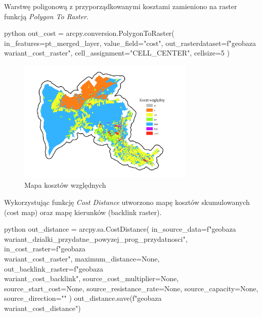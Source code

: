\documentclass{article}
\begin{document}
Warstwę poligonową z przyporządkowanymi kosztami zamieniono na raster funkcją \textit{Polygon To Raster}.
\vspace{5pt}

\begin{mintedbox}{python}
out_cost = arcpy.conversion.PolygonToRaster(
    in_features=pt_merged_layer,
    value_field="cost",
    out_rasterdataset=f"{geobaza}\\{wariant}_cost_raster",
    cell_assignment="CELL_CENTER",
    cellsize=5
)
\end{mintedbox}
\vspace{5pt}

\begin{figure}[H]
    \centering
    \includegraphics[width=0.75\textwidth]{img/cost-raster.jpg}
    \caption{Mapa kosztów względnych}
\end{figure}
\vspace{10pt}

Wykorzystując funkcję \textit{Cost Distance} utworzono mapę kosztów skumulowanych (cost map) oraz mapę kierunków (backlink raster).
\vspace{5pt}

\begin{mintedbox}{python}
out_distance = arcpy.sa.CostDistance(
    in_source_data=f"{geobaza}\\{wariant}_dzialki_przydatne_powyzej_{prog_przydatnosci}",
    in_cost_raster=f"{geobaza}\\{wariant}_cost_raster",
    maximum_distance=None,
    out_backlink_raster=f"{geobaza}\\{wariant}_cost_backlink",
    source_cost_multiplier=None,
    source_start_cost=None,
    source_resistance_rate=None,
    source_capacity=None,
    source_direction=""
)
out_distance.save(f"{geobaza}\\{wariant}_cost_distance")
\end{mintedbox}
\vspace{5pt}
\end{document}
